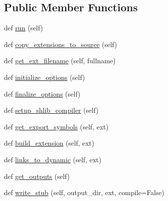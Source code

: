 \subsection*{Public Member Functions}
\begin{DoxyCompactItemize}
\item 
def \hyperlink{classsetuptools_1_1command_1_1build__ext_1_1build__ext_a0372d0eabace81aa2e90696daadc6d53}{run} (self)
\item 
def \hyperlink{classsetuptools_1_1command_1_1build__ext_1_1build__ext_a48d3a798a1f80e22af46ea54bf353780}{copy\+\_\+extensions\+\_\+to\+\_\+source} (self)
\item 
def \hyperlink{classsetuptools_1_1command_1_1build__ext_1_1build__ext_aa70c67c690d0bf9105529fccd60418a4}{get\+\_\+ext\+\_\+filename} (self, fullname)
\item 
def \hyperlink{classsetuptools_1_1command_1_1build__ext_1_1build__ext_a6376896e22a6d2a234af6cb1df5c637f}{initialize\+\_\+options} (self)
\item 
def \hyperlink{classsetuptools_1_1command_1_1build__ext_1_1build__ext_a00c5288297268466cb1e33b460d8ca6c}{finalize\+\_\+options} (self)
\item 
def \hyperlink{classsetuptools_1_1command_1_1build__ext_1_1build__ext_a41d4833a23e6f467d4067a06d6babe38}{setup\+\_\+shlib\+\_\+compiler} (self)
\item 
def \hyperlink{classsetuptools_1_1command_1_1build__ext_1_1build__ext_a763a874cb094fa7d4a375fd62fa6fe0f}{get\+\_\+export\+\_\+symbols} (self, ext)
\item 
def \hyperlink{classsetuptools_1_1command_1_1build__ext_1_1build__ext_a5d505e4bd3daa3a2ef2a5fead744d519}{build\+\_\+extension} (self, ext)
\item 
def \hyperlink{classsetuptools_1_1command_1_1build__ext_1_1build__ext_a26e3f247bf436a79048835621d25416a}{links\+\_\+to\+\_\+dynamic} (self, ext)
\item 
def \hyperlink{classsetuptools_1_1command_1_1build__ext_1_1build__ext_a79c43a39b876e13c625b36ed391fe43c}{get\+\_\+outputs} (self)
\item 
def \hyperlink{classsetuptools_1_1command_1_1build__ext_1_1build__ext_a593552ddbaafdb05c41051c5d549971f}{write\+\_\+stub} (self, output\+\_\+dir, ext, compile=False)
\end{DoxyCompactItemize}
